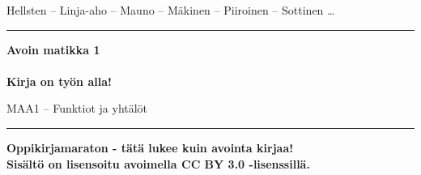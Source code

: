 
\begin{center}
    \begin{doublespace}
        \begin{LARGE}
            \textrm{Hellsten -- Linja-aho -- Mauno -- Mäkinen -- Piiroinen -- Sottinen \ldots} \\
        \end{LARGE}
      
        \vspace{0.5cm}
        \hrule height 2pt
        \vspace{1cm}
        \begin{Huge}
            \textbf{\textrm{Avoin matikka 1}\\\ \\Kirja on työn alla!}
        \end{Huge}
      
        \vfill
      
        \begin{huge}
            \textrm{MAA1 -- Funktiot ja yhtälöt}
        \end{huge}
        \vspace{1cm}
        \hrule height 2pt
    \end{doublespace}
\end{center}

\vfill

\begin{flushright}
    \textbf{
        Oppikirjamaraton - tätä lukee kuin avointa kirjaa! \\
        Sisältö on lisensoitu avoimella CC BY 3.0 -lisenssillä. \\
    }
\end{flushright}